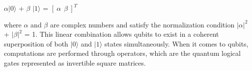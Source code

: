 \documentclass[12pt]{report}
\begin{document}
\begin{minipage}{1 \textwidth}
		
		\begin{center}
			$\alpha |0 \rangle$ + $\beta$ $|1 \rangle$ =  $[ \ \alpha \ \ \beta \ ]^T $
		\end{center}
		
		where $\alpha$ and $\beta$ are complex numbers and satisfy the normalization condition $|\alpha|^2$ + $|\beta|^2$ = 1. This linear combination allows qubits to exist in a coherent superposition of both $|0 \rangle$ and $ |1 \rangle$  states simultaneously.  \newline
		When it comes to qubits, computations are performed through operators, which are the quantum logical gates represented as invertible square matrices. \newline
		
		
		
	\end{minipage}
 
\end{document}
